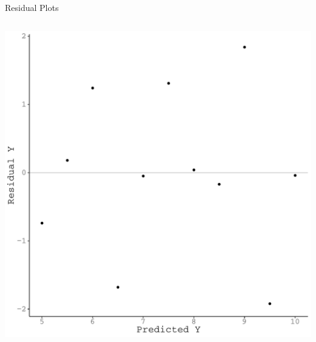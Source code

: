 \documentclass{beamer}\usepackage[]{graphicx}\usepackage[]{color}
\makeatletter
\def\maxwidth{ %
  \ifdim\Gin@nat@width>\linewidth
    \linewidth
  \else
    \Gin@nat@width
  \fi
}
\newenvironment{knitrout}{}{} %
\makeatother
\begin{document}
\begin{frame}{Residual Plots}
\begin{columns}
\begin{column}{0.5\textwidth}
\begin{knitrout}
{\centering \includegraphics[width=\maxwidth]{figure/unnamed-chunk-2-1} 

}



\end{knitrout}

\end{column}
\end{columns}

\end{frame}

\end{document}
